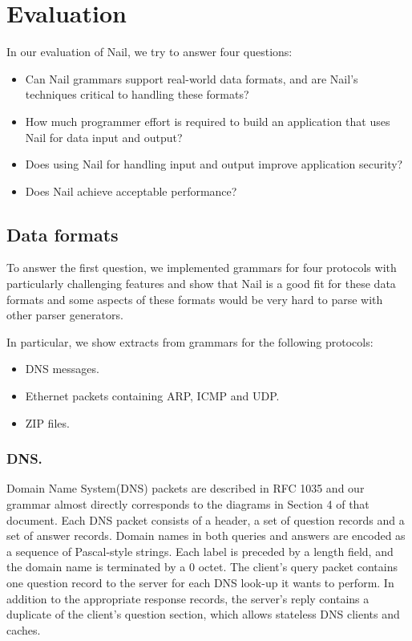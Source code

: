 \section{Evaluation}
\label{s:eval}



In our evaluation of Nail, we try to answer four questions:

\begin{itemize}

\item Can Nail grammars support real-world data formats, and
      are Nail's techniques critical to handling these formats?

\item How much programmer effort is required to build an
      application that uses Nail for data input and output?

\item Does using Nail for handling input and output improve
      application security?

\item Does Nail achieve acceptable performance?

\end{itemize}

\subsection{Data formats}
\label{s:eval-formats}
To answer the first question, we implemented grammars for four protocols with particularly
challenging features and show that Nail is a good fit for these data formats and some aspects of
these formats would be very hard to parse with other parser generators.



In particular, we show extracts from grammars for the following protocols: 
\begin{itemize}
\item DNS messages.
\item Ethernet packets containing ARP, ICMP and UDP.
\item ZIP files.

\end{itemize}

\subsubsection{DNS.}


Domain Name System(DNS) packets are described in RFC 1035 and our grammar almost directly
corresponds to the diagrams in Section 4 of that document. Each DNS packet consists of a header, a
set of question records and a set of answer records. Domain names in both queries and answers are
encoded as a sequence of Pascal-style strings. Each label is preceded by a length field, and the
domain name is terminated by a $0$ octet. The client's query packet contains one question
record to the server for each DNS look-up it wants to perform. In addition to the appropriate
response records, the server's reply contains a duplicate of the client's question section, which
allows stateless DNS clients and caches.


